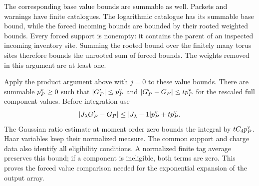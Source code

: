 The corresponding base value bounds are summable as well. Packets
and warnings have finite catalogues. The logarithmic catalogue has
its summable base bound, while the forced incoming bounds are bounded
by their rooted weighted bounds. Every forced support is nonempty:
it contains the parent of an inspected incoming inventory site.
Summing the rooted bound over the finitely many torus sites therefore
bounds the unrooted sum of forced bounds. The weights removed in this
argument are at least one.

Apply the product argument above with $j=0$ to these value bounds.
There are summable $p_P^{\rm v}\ge0$ such that
$|G_P'|\le p_P^{\rm v}$ and
$|G_P'-G_P|\le t p_P^{\rm v}$ for the rescaled full component values.
Before integration use
\[
 |J_\lambda G_P'-G_P|
       \le |J_\lambda-1|p_P^{\rm v}+t p_P^{\rm v}.
\]
The Gaussian ratio estimate at moment order zero bounds the integral
by $tC_4p_P^{\rm v}$. Haar variables keep their normalized measure.
The common support and charge data also identify all eligibility
conditions. A normalized finite tag average preserves this bound;
if a component is ineligible, both terms are zero. This proves the
forced value comparison needed for the exponential expansion of the
output array.
